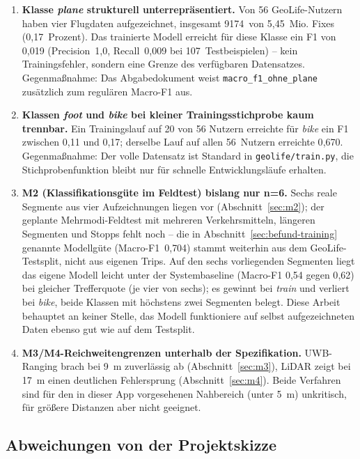 \documentclass[11pt,a4paper,oneside]{article}
\begin{document}
\begin{enumerate}
    \item \textbf{Klasse \emph{plane} strukturell unterrepräsentiert.} Von
    56 GeoLife-Nutzern haben vier Flugdaten aufgezeichnet, insgesamt
    9174~von 5,45~Mio. Fixes (0{,}17~Prozent). Das trainierte Modell
    erreicht für diese Klasse ein F1 von 0{,}019 (Precision~1{,}0,
    Recall~0{,}009 bei 107~Testbeispielen) -- kein Trainingsfehler, sondern
    eine Grenze des verfügbaren Datensatzes. Gegenmaßnahme: Das
    Abgabedokument weist \texttt{macro\_f1\_ohne\_plane} zusätzlich zum
    regulären Macro-F1 aus.
    \item \textbf{Klassen \emph{foot} und \emph{bike} bei kleiner
    Trainingsstichprobe kaum trennbar.} Ein Trainingslauf auf 20 von 56
    Nutzern erreichte für \emph{bike} ein F1 zwischen 0{,}11 und 0{,}17;
    derselbe Lauf auf allen 56~Nutzern erreichte 0{,}670. Gegenmaßnahme:
    Der volle Datensatz ist Standard in \texttt{geolife/train.py}, die
    Stichprobenfunktion bleibt nur für schnelle Entwicklungsläufe erhalten.
    \item \textbf{M2 (Klassifikationsgüte im Feldtest) bislang nur n=6.}
    Sechs reale Segmente aus vier Aufzeichnungen liegen vor
    (Abschnitt~\ref{sec:m2}); der geplante Mehrmodi-Feldtest mit mehreren
    Verkehrsmitteln, längeren Segmenten und Stopps fehlt noch -- die in
    Abschnitt~\ref{sec:befund-training} genannte Modellgüte
    (Macro-F1~0{,}704) stammt weiterhin aus dem GeoLife-Testsplit, nicht aus
    eigenen Trips. Auf den sechs vorliegenden Segmenten liegt das eigene
    Modell leicht unter der Systembaseline (Macro-F1 0{,}54 gegen 0{,}62) bei
    gleicher Trefferquote (je vier von sechs); es gewinnt bei \emph{train}
    und verliert bei \emph{bike}, beide Klassen mit höchstens zwei
    Segmenten belegt. Diese Arbeit behauptet an
    keiner Stelle, das Modell funktioniere auf selbst aufgezeichneten Daten
    ebenso gut wie auf dem Testsplit.
    \item \textbf{M3/M4-Reichweitengrenzen unterhalb der Spezifikation.}
    UWB-Ranging brach bei 9~m zuverlässig ab (Abschnitt~\ref{sec:m3}),
    LiDAR zeigt bei 17~m einen deutlichen Fehlersprung
    (Abschnitt~\ref{sec:m4}). Beide Verfahren sind für den in dieser App
    vorgesehenen Nahbereich (unter 5~m) unkritisch, für größere Distanzen
    aber nicht geeignet.
\end{enumerate}

\subsection{Abweichungen von der Projektskizze}
\label{sec:abweichungen}
\end{document}
